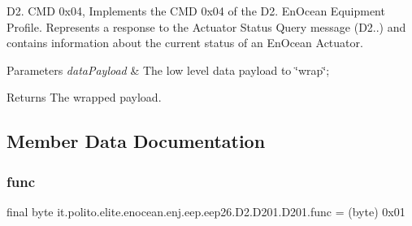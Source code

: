 D2. C\+MD 0x04, Implements the C\+MD 0x04 of the D2. En\+Ocean Equipment Profile. Represents a response to the Actuator Status Query message (D2..) and contains information about the current status of an En\+Ocean Actuator.


\begin{DoxyParams}{Parameters}
{\em data\+Payload} & The low level data payload to \char`\"{}wrap\char`\"{}; \\
\hline
\end{DoxyParams}
\begin{DoxyReturn}{Returns}
The wrapped payload. 
\end{DoxyReturn}


\subsection{Member Data Documentation}
\hypertarget{classit_1_1polito_1_1elite_1_1enocean_1_1enj_1_1eep_1_1eep26_1_1_d2_1_1_d201_1_1_d201_a7486b7dc81e2aaf72207f3d1337da1ac}{}\label{classit_1_1polito_1_1elite_1_1enocean_1_1enj_1_1eep_1_1eep26_1_1_d2_1_1_d201_1_1_d201_a7486b7dc81e2aaf72207f3d1337da1ac} 
\subsubsection{\texorpdfstring{func}{func}}
{\footnotesize\ttfamily final byte it.\+polito.\+elite.\+enocean.\+enj.\+eep.\+eep26.\+D2.\+D201.\+D201.\+func = (byte) 0x01\hspace{0.3cm}{\ttfamily [static]}}

\hypertarget{classit_1_1polito_1_1elite_1_1enocean_1_1enj_1_1eep_1_1eep26_1_1_d2_1_1_d201_1_1_d201_a3260adfec1c9c4541987347b8bdb630a}{}\label{classit_1_1polito_1_1elite_1_1enocean_1_1enj_1_1eep_1_1eep26_1_1_d2_1_1_d201_1_1_d201_a3260adfec1c9c4541987347b8bdb630a} 
